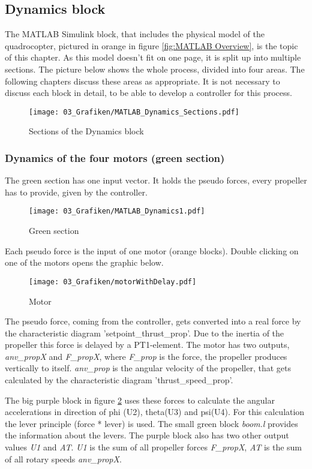 \subsection{Dynamics block}\label{chapter_DYNAMICS_BLOCK}
The MATLAB Simulink block, that includes the physical model of the quadrocopter, pictured in orange in figure \ref{fig:MATLAB Overview}, is the topic of this chapter.
As this model doesn't fit on one page, it is split up into multiple sections. The picture below shows the whole process, divided into four areas. The following chapters discuss these areas as appropriate. It is not necessary to discuss each block in detail, to be able to develop a controller for this process.
\begin{figure}[H]
	\centering
		\texttt{[image: 03\_Grafiken/MATLAB\_Dynamics\_Sections.pdf]}
	\caption{Sections of the Dynamics block}
	\label{fig:MATLAB Dynamics Sections}
\end{figure}
\clearpage %

\subsubsection{Dynamics of the four motors (green section)}\label{chapter_GREEN_SECTION}
The green section has one input vector. It holds the pseudo forces, every propeller has to provide, given by the controller.
\begin{figure}[H]
	\centering
		\texttt{[image: 03\_Grafiken/MATLAB\_Dynamics1.pdf]}
	\caption{Green section}
	\label{fig:MATLAB Dynamics1}
\end{figure}
Each pseudo force is the input of one motor (orange blocks). 
Double clicking on one of the motors opens the graphic below.
\begin{figure}[H]
	\centering
		\texttt{[image: 03\_Grafiken/motorWithDelay.pdf]}
	\caption{Motor}
	\label{fig:motor}
\end{figure}
The pseudo force, coming from the controller, gets converted into a real force by the characteristic diagram 'setpoint\_thrust\_prop'. Due to the inertia of the propeller this force is delayed by a PT1-element.
The motor has two outputs, \textit{anv\_propX} and \textit{F\_propX}, where \textit{F\_prop} is the force, the propeller produces vertically to itself. \textit{anv\_prop} is the angular velocity of the propeller, that gets calculated by the characteristic diagram 'thrust\_speed\_prop'.

The big purple block in figure \ref {fig:MATLAB Dynamics1} uses these forces to calculate the angular accelerations in direction of phi (U2), theta(U3) and psi(U4). For this calculation the lever principle (force * lever) is used. The small green block \textit{boom.l} provides the information about the levers. 
The purple block also has two other output values \textit{U1} and \textit{AT}. \textit{U1} is the sum of all propeller forces \textit{F\_propX}, \textit{AT} is the sum of all rotary speeds \textit{anv\_propX}.

